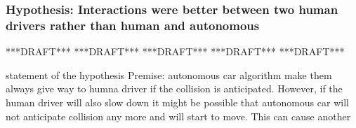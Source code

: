 \documentclass[11pt,english]{article}
\begin{document}
\begin{figure}[!] %
\caption{}
\label{fig:equilibrum}
\end{figure} 



















\subsubsection{Hypothesis: Interactions were better between two human drivers rather than human and autonomous}

***DRAFT***
***DRAFT***
***DRAFT***
***DRAFT***
***DRAFT***


statement of the hypothesis
Premise: autonomous car algorithm make them always give way to humna driver if the collision is anticipated. However, if the human driver will also slow down it might be possible that autonomous car will not anticipate collision any more and will start to move. This can cause another   
\end{document}
